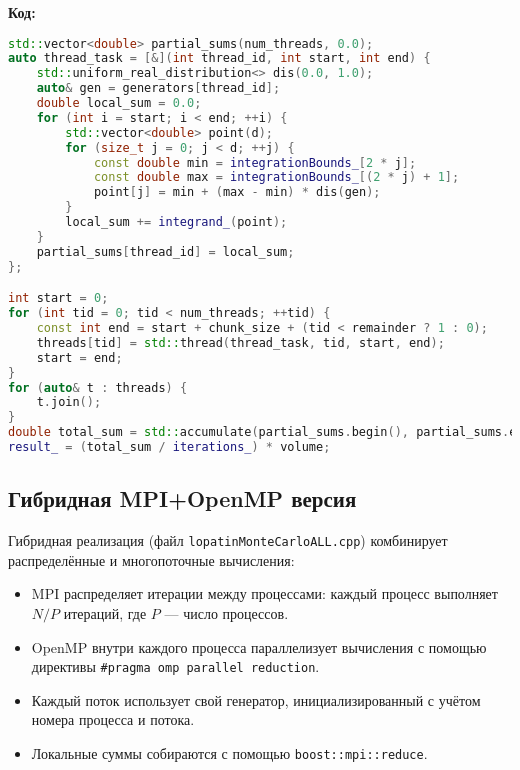 \documentclass[12pt,a4paper]{extarticle}
\begin{document}
\textbf{Код:}
\begin{lstlisting}[language=C++]
std::vector<double> partial_sums(num_threads, 0.0);
auto thread_task = [&](int thread_id, int start, int end) {
    std::uniform_real_distribution<> dis(0.0, 1.0);
    auto& gen = generators[thread_id];
    double local_sum = 0.0;
    for (int i = start; i < end; ++i) {
        std::vector<double> point(d);
        for (size_t j = 0; j < d; ++j) {
            const double min = integrationBounds_[2 * j];
            const double max = integrationBounds_[(2 * j) + 1];
            point[j] = min + (max - min) * dis(gen);
        }
        local_sum += integrand_(point);
    }
    partial_sums[thread_id] = local_sum;
};

int start = 0;
for (int tid = 0; tid < num_threads; ++tid) {
    const int end = start + chunk_size + (tid < remainder ? 1 : 0);
    threads[tid] = std::thread(thread_task, tid, start, end);
    start = end;
}
for (auto& t : threads) {
    t.join();
}
double total_sum = std::accumulate(partial_sums.begin(), partial_sums.end(), 0.0);
result_ = (total_sum / iterations_) * volume;
\end{lstlisting}

\subsection{Гибридная MPI+OpenMP версия}
Гибридная реализация (файл \texttt{lopatinMonteCarloALL.cpp}) комбинирует распределённые и многопоточные вычисления:
\begin{itemize}
    \item MPI распределяет итерации между процессами: каждый процесс выполняет \(N / P\) итераций, где \(P\) — число процессов.
    \item OpenMP внутри каждого процесса параллелизует вычисления с помощью директивы \texttt{\#pragma omp parallel reduction}.
    \item Каждый поток использует свой генератор, инициализированный с учётом номера процесса и потока.
    \item Локальные суммы собираются с помощью \texttt{boost::mpi::reduce}.
\end{itemize}
\end{document}
